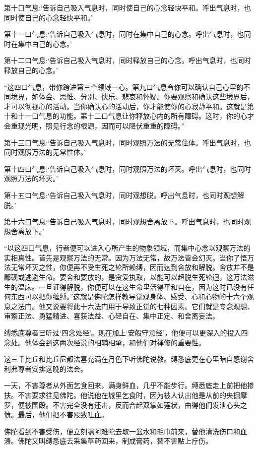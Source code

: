 \documentclass[12pt,twoside,openany]{book}
\begin{document}
第十口气息:‘告诉自己吸入气息时，同时使自己的心念轻快平和。呼出气息时，也同时使自己的心念轻快平和。’

第十一口气息:‘告诉自己吸入气息时，同时在集中自己的心念。呼出气息时，也同时在集中白己的心念。’

第十二口气息:‘告诉自己吸入气息时，同时释放自己的心念。呼出气息时，也同时释放自己的心念。’

“这四口气息，带你跨进第三个领域一心。第九口气息令你可以确认自己心里的不同境界，如体会、思惟、分别、快乐、悲哀和怀疑。你要观察和确认这些境界后，才可以彻视心的活动。当你确认心的活动后，你才能使你的心寂静平和。这就是第十和十一口气息的功能。第十二口气息让你释放心内的所有障碍。这时，你的心才会重现光明，照见行念的根源，因而可以降伏重重的障碍。”

第十三口气息:‘告诉自己吸入气息时，同时观照万法的无常住体。呼出气息时，也同时观照万法的无常性体。’

第十四口气息:‘告诉自己吸入气息时，同时观照万法的坏灭。呼出气息时，也同时观照万法的坏灭。’

第十五口气息:‘告诉自己吸入气息时，同时观想脱。呼出气息时，也同时观想解脱。’

第十六口气息:‘告诉自己吸入气息时，同时观想舍离放下。呼出气息时，也同时观想舍离放下。’

“以这四口气息，行者便可以进入心所产生的物象领域，而集中心念以观察万法的实相真性。首先是观察万法的无常。因为万法无常，故万法皆会幻灭。当你了悟万法无常坏灭之性，你便再不受生死之轮所赖缚，因而达到舍放和解脱。舍放并不是鄙砚或逃避生命。要舍和要放的，是贪爱执取，以能可以超脱生死轮迥，这万法滋生的温床。一旦证得解脱，你便可以在这生命里活得平和自在，因为这时已没有任何东西可以把你缠缚。”这就是佛陀怎样教导觉观身体、感受、心和心物的十六个观息之法门。他又说要将此十六法门用于导致正觉的七种因素。它们就是专念观想、审察正法、勇猛精进、喜获法益、心轻自在、集中正定、和舍离妄法。

缚悉底尊者已听过‘四念处经’。现在加上‘安般守意经’，他便可以更深入的投入四念处。他体会到这两次经说的相辅相承，和他们对禅修的重要性。

这三千比丘和比丘尼都法喜充满在月色下听佛陀说教。缚悉底更在心里暗自感谢舍利弗尊者安排这晚的法会。

一天，不害尊者从外面乞食回来，满身鲜血，几乎不能步行。缚悉底走上前把他掺扶。不害要求往见佛陀。他说他在城里乞食时，因为被人认出他是从前的央掘摩罗，便被围殴。不害完全没有还击，反而合起双掌如莲状，由得他们发泄心头之愤。最后，他们把不害殴致吐血。

佛陀看到不害受伤，便立刻嘱阿难陀去取一盆水和毛巾前来，替他清洗伤口和血渍。佛陀又叫缚悉底去采集草药回来，制成膏药，替不害贴上疗伤。
\end{document}
